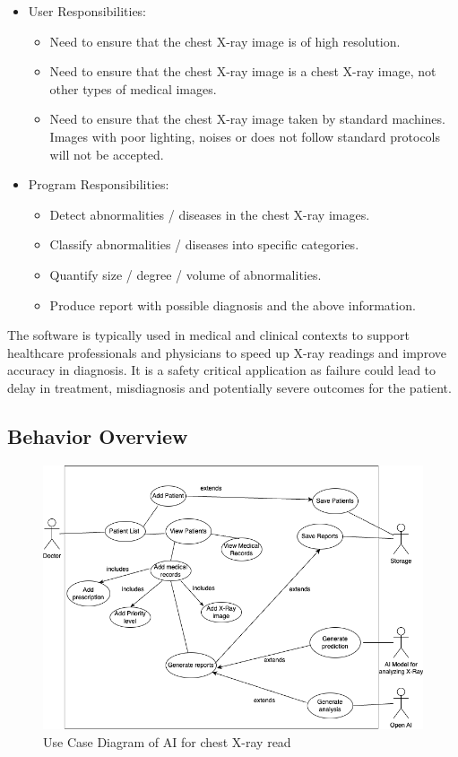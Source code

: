 \documentclass[12pt]{article}
\begin{document}
\begin{itemize}
\item User Responsibilities:
\begin{itemize}
\item {Need to ensure that the chest X-ray image is of high resolution. }
\item {Need to ensure that the chest X-ray image is a chest X-ray image, not other types of medical images.}
\item {Need to ensure that the chest X-ray image taken by standard machines. Images with poor lighting, noises or does not follow standard protocols will not be accepted. }
\end{itemize}
\item Program Responsibilities:
\begin{itemize}
\item {Detect abnormalities / diseases in the chest X-ray images.}
\item {Classify abnormalities / diseases into specific categories.}
\item {Quantify size / degree / volume of abnormalities.}
\item {Produce report with possible diagnosis and the above information.}
\end{itemize}
\end{itemize}
The software is typically used in medical and clinical contexts to support healthcare professionals and physicians to speed up X-ray readings and improve accuracy in diagnosis. It is a safety critical application as failure could lead to delay in treatment, misdiagnosis and potentially severe outcomes for the patient.
\subsection{Behavior Overview}
\begin{figure}[H] 
  \centering
  \includegraphics[width=1\linewidth]{UseCase.png}
  \caption{Use Case Diagram of AI for chest X-ray read}
  \label{fig:use-case-diagram}
\end{figure}
\vspace{-5em} 
\newpage
\end{document}
